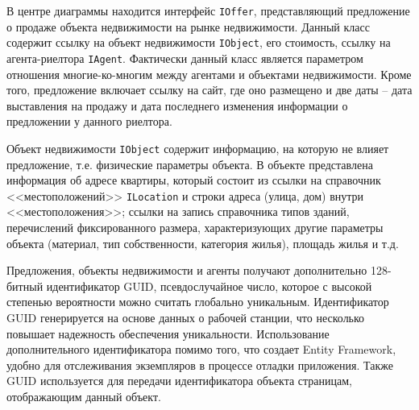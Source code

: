 \documentclass[a4paper,14pt,openany,final]{extreport} %
\begin{document}
В центре диаграммы находится интерфейс \verb|IOffer|, представляющий предложение о продаже объекта недвижимости на рынке недвижимости. Данный класс содержит ссылку на объект недвижимости \verb|IObject|, его стоимость, ссылку на агента-риелтора \verb|IAgent|. Фактически данный класс является параметром отношения многие-ко-многим между агентами и объектами недвижимости. Кроме того, предложение включает ссылку на сайт, где оно размещено и две даты -- дата выставления на продажу и дата последнего изменения информации о предложении у данного риелтора.

Объект недвижимости \verb|IObject| содержит информацию, на которую не влияет предложение, т.е. физические параметры объекта. В объекте представлена информация об адресе квартиры, который состоит из ссылки на справочник <<местоположений>> \verb|ILocation| и строки адреса (улица, дом) внутри <<местоположения>>; ссылки на запись справочника типов зданий, перечислений фиксированного размера, характеризующих другие параметры объекта (материал, тип собственности, категория жилья), площадь жилья и т.д.

Предложения, объекты недвижимости и агенты получают дополнительно 128-битный идентификатор GUID, псевдослучайное число, которое с высокой степенью вероятности можно считать глобально уникальным. Идентификатор GUID генерируется на основе данных о рабочей станции, что несколько повышает надежность обеспечения уникальности.  Использование дополнительного идентификатора помимо того, что создает Entity Framework, удобно для отслеживания экземпляров в процессе отладки приложения. Также GUID используется для передачи идентификатора объекта страницам, отображающим данный объект.
\end{document}
